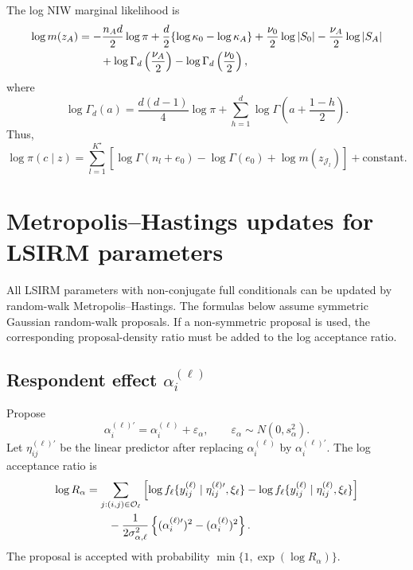 \documentclass[11pt]{article}
\begin{document}
The log NIW marginal likelihood is
\begin{align}
    \log m(z_A)
    &=-\frac{n_A d}{2}\log\pi
    +\frac{d}{2}\{\log\kappa_0-\log\kappa_A\}
    +\frac{\nu_0}{2}\log|S_0|
    -\frac{\nu_A}{2}\log|S_A|
    \notag\\
    &\qquad
    +\log\Gamma_d\left(\frac{\nu_A}{2}\right)
    -\log\Gamma_d\left(\frac{\nu_0}{2}\right),
    \label{eq:niw-marginal}
\end{align}
where
\begin{equation}
    \log\Gamma_d(a)
    =
    \frac{d(d-1)}{4}\log\pi
    +
    \sum_{h=1}^d\log\Gamma\left(a+\frac{1-h}{2}\right).
\end{equation}
Thus,
\begin{equation}
    \log\pi(c\mid z)
    =
    \sum_{l=1}^{K^\star}
    \left[
    \log\Gamma(n_l+e_0)-\log\Gamma(e_0)
    +\log m(z_{\mathcal J_l})
    \right]
    +\mathrm{constant}.
    \label{eq:log-collapsed-partition-target}
\end{equation}

\section{Metropolis--Hastings updates for LSIRM parameters}

All LSIRM parameters with non-conjugate full conditionals can be updated by
random-walk Metropolis--Hastings.  The formulas below assume symmetric
Gaussian random-walk proposals.  If a non-symmetric proposal is used, the
corresponding proposal-density ratio must be added to the log acceptance ratio.

\subsection{Respondent effect $\alpha_i^{(\ell)}$}

Propose
\[
    \alpha_i^{(\ell)\prime}
    =
    \alpha_i^{(\ell)}+\varepsilon_\alpha,
    \qquad
    \varepsilon_\alpha\sim N(0,s_\alpha^2).
\]
Let $\eta_{ij}^{(\ell)\prime}$ be the linear predictor after replacing
$\alpha_i^{(\ell)}$ by $\alpha_i^{(\ell)\prime}$.  The log acceptance ratio is
\begin{align}
    \log R_\alpha
    &=
    \sum_{j:(i,j)\in\mathcal O_\ell}
    \left[
    \log f_\ell\{y_{ij}^{(\ell)}\mid \eta_{ij}^{(\ell)\prime},\xi_\ell\}
    -
    \log f_\ell\{y_{ij}^{(\ell)}\mid \eta_{ij}^{(\ell)},\xi_\ell\}
    \right]
    \notag\\
    &\qquad
    -
    \frac{1}{2\sigma_{\alpha,\ell}^2}
    \left\{(\alpha_i^{(\ell)\prime})^2-(\alpha_i^{(\ell)})^2\right\}.
    \label{eq:alpha-mh-ratio}
\end{align}
The proposal is accepted with probability $\min\{1,\exp(\log R_\alpha)\}$.
\end{document}
